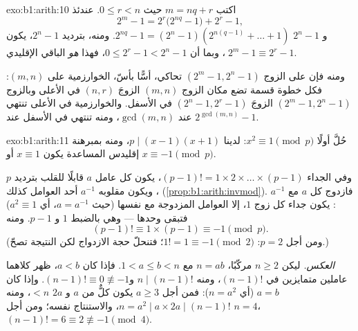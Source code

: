 \begin{solution}{exo:b1:arith:10}
اكتب $m = nq + r$ حيث $0 \leq r < n$. عندئذ
\[
2^m - 1 = 2^r\bigl(2^{nq} - 1\bigr) + 2^r - 1,
\]
و $2^n - 1$  $2^{nq} - 1 = (2^n - 1)(2^{n(q-1)} + \dots +
1)$. ومنه، بترديد $2^n - 1$، يكون $\;2^m - 1 \equiv 2^r - 1$، وبما أن $0 \leq
2^r - 1 < 2^n - 1$، فهذا \emph{هو} الباقي الإقليدي.

ومنه فإن  على الزوج $(2^m - 1, 2^n - 1)$
تحاكي، أسًّا بأسّ، الخوارزمية على $(m, n)$: فكل
خطوة قسمة تضع مكان الزوج $(m, n)$ الزوجَ $(n, r)$ في الأعلى وبالزوج $(2^m - 1,
2^n - 1)$ الزوجَ $(2^n - 1, 2^r - 1)$ في الأسفل. والخوارزمية في الأعلى
تنتهي عند $\gcd(m,n)$، ومنه تنتهي في الأسفل عند
$2^{\gcd(m,n)} - 1$.
\end{solution}

\begin{solution}{exo:b1:arith:11}
حُلَّ أولًا $x^2 \equiv 1 \pmod p$: لدينا $p \mid (x-1)(x+1)$، ومنه بمبرهنة
إقليدس المساعدة يكون $x \equiv 1$ أو $x \equiv -1 \pmod p$.

وفي الجداء $(p-1)! = 1 \times 2 \times \dots \times (p-1)$، يكون كل
عامل $a$ قابلًا للقلب بترديد $p$، ويكون مقلوبه $a^{-1}$ أحد
العوامل كذلك (\cref{prop:b1:arith:invmod}). فازدوج كل $a$ مع
$a^{-1}$: يكون جداء كل زوج $1$، إلا العوامل المزدوجة مع نفسها
(حيث $a = a^{-1}$، أي $a^2 \equiv 1$) فتبقى وحدها --- وهي
بالضبط $1$ و $p - 1$. ومنه
\[
(p-1)! \equiv 1 \times (p - 1) \equiv -1 \pmod p .
\]
(ومن أجل $p = 2$: $1! = 1 \equiv -1 \pmod 2$؛ فتنحلّ حجة الازدواج
لكن النتيجة تصحّ.)

\emph{العكس.} ليكن $n \geq 2$ مركّبًا، $n = ab$ مع $1 < a
\leq b < n$. فإذا كان $a < b$، ظهر كلاهما عاملين متمايزين في $(n-1)!$،
ومنه $n \mid (n-1)!$ و$(n-1)! \equiv 0 \not\equiv -1$. وإذا كان $a = b$
(أي $n = a^2$): فمن أجل $a \geq 3$ يكون كلٌّ من $a$ و $2a$ $< n$، ومنه
$n = a^2 \mid a \times 2a \mid (n-1)!$، والاستنتاج نفسه؛ ومن أجل $n = 4$،
$(n-1)! = 6 \equiv 2 \not\equiv -1 \pmod 4$.
\end{solution}

